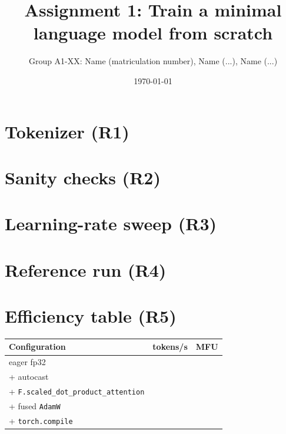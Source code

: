 \documentclass[11pt,a4paper]{article}
\title{Assignment 1: Train a minimal language model from scratch}
\author{Group A1-XX: Name (matriculation number), Name (...), Name (...)}
\date{\today}
\begin{document}
\maketitle

\section{Tokenizer (R1)}

\section{Sanity checks (R2)}

\section{Learning-rate sweep (R3)}

\section{Reference run (R4)}

\section{Efficiency table (R5)}
\begin{table}[h]\centering
\begin{tabular}{@{}lrr@{}}\toprule
Configuration & tokens/s & MFU \\\midrule
eager fp32 & & \\
+ autocast & & \\
+ \texttt{F.scaled\_dot\_product\_attention} & & \\
+ fused \texttt{AdamW} & & \\
+ \texttt{torch.compile} & & \\\bottomrule
\end{tabular}\end{table}
\end{document}

